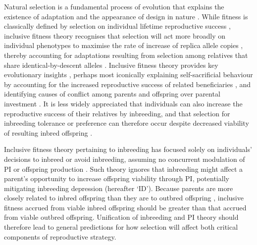 \documentclass[12pt]{article}
\begin{document}

Natural selection is a fundamental process of evolution that explains the existence of adaptation and the appearance of design in nature \cite[][]{Frank2012a, Grafen2015a, Reznick2016}. While fitness is classically defined by selection on individual lifetime reproductive success \cite[][]{Darwin1859, Dawkins1982}, inclusive fitness theory recognises that selection will act more broadly on individual phenotypes to maximise the rate of increase of replica allele copies \cite[][]{Hamilton1964, Hamilton1964a, Grafen2006}, thereby accounting for adaptations resulting from selection among relatives that share identical-by-descent alleles \cite[][]{Fisher2013, Bourke2014, Liao2015}. Inclusive fitness theory provides key evolutionary insights \cite[][]{Gardner2014}, perhaps most iconically explaining self-sacrificial behaviour by accounting for the increased reproductive success of related beneficiaries \cite[][]{Hamilton1964, Frank2013}, and identifying causes of conflict among parents and offspring over parental investment \cite[hereafter `PI';][]{Trivers1972, Trivers1974, Kolliker2015}. It is less widely appreciated that individuals can also increase the reproductive success of their relatives by inbreeding, and that selection for inbreeding tolerance or preference can therefore occur despite decreased viability of resulting inbred offspring \cite[i.e., ``inbreeding depression''][]{Parker1979, Parker2006}.

Inclusive fitness theory pertaining to inbreeding has focused solely on individuals' decisions to inbreed or avoid inbreeding, assuming no concurrent modulation of PI or offspring production \cite[e.g.,][]{Parker2006, Kokko2006, Duthie2015a}. Such theory ignores that inbreeding might affect a parent's opportunity to increase offspring viability through PI, potentially mitigating inbreeding depression (hereafter `ID'). Because parents are more closely related to inbred offspring than they are to outbred offspring \cite{Trivers1974, Lynch1998, Reid2016}, inclusive fitness accrued from viable inbred offspring should be greater than that accrued from viable outbred offspring. Unification of inbreeding and PI theory should therefore lead to general predictions for how selection will affect both critical components of reproductive strategy.
\end{document}
